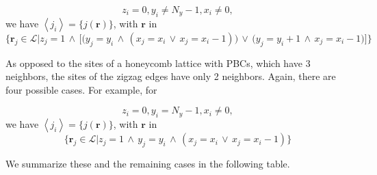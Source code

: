 \begin{equation*}
z_i = 0, y_i \neq N_y - 1, x_i \neq 0 ,
\end{equation*}
we have $\left\langle j_i \right\rangle = \{ j ( \bm r) \}$, with $\bm r$ in
\begin{equation*}
\bigg\{ \bm r_j \in \mathcal{L} \bigg| z_j = 1 \,\land\, \bigg[ \bigg( y_j = y_i  \,\land\, ( x_j = x_i \,\lor\, x_j = x_i - 1) \bigg) \,\lor\, \bigg( y_j = y_i + 1  \,\land\, x_j = x_i - 1  \bigg)  \bigg] \bigg\}
\end{equation*}

As opposed to the sites of a honeycomb lattice with \acp{PBC}, which have 3 neighbors, the sites of the zigzag edges have only 2 neighbors.
Again, there are four possible cases. For example, for 

\begin{equation*}
z_i = 0, y_i = N_y - 1, x_i \neq 0 ,
\end{equation*}
we have $\left\langle j_i \right\rangle = \{ j ( \bm r) \}$, with $\bm r$ in
\begin{equation*}
\bigg\{ \bm r_j \in \mathcal{L} \bigg| z_j = 1 \,\land\, y_j = y_i  \,\land\, ( x_j = x_i \,\lor\, x_j = x_i - 1) \bigg\}
\end{equation*}

We summarize these and the remaining cases in the following table.

